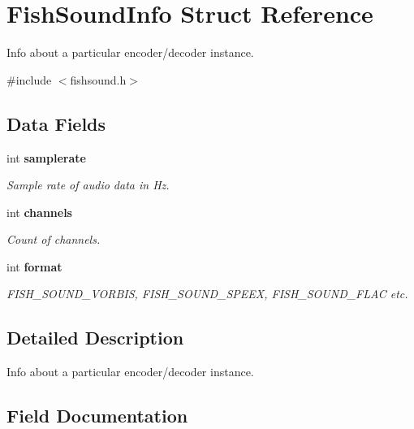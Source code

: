 \section{\-Fish\-Sound\-Info \-Struct \-Reference}
\label{structFishSoundInfo}


\-Info about a particular encoder/decoder instance.  




{\ttfamily \#include $<$fishsound.\-h$>$}

\subsection*{\-Data \-Fields}
\begin{DoxyCompactItemize}
\item 
int {\bf samplerate}\label{structFishSoundInfo_a9b19fb535b78f4df6cd4a275a595e736}

\begin{DoxyCompactList}\small\item\em \-Sample rate of audio data in \-Hz. \end{DoxyCompactList}\item 
int {\bf channels}\label{structFishSoundInfo_ac1e2bc71184e6311f54ff6bcd9160123}

\begin{DoxyCompactList}\small\item\em \-Count of channels. \end{DoxyCompactList}\item 
int {\bf format}
\begin{DoxyCompactList}\small\item\em \-F\-I\-S\-H\-\_\-\-S\-O\-U\-N\-D\-\_\-\-V\-O\-R\-B\-I\-S, \-F\-I\-S\-H\-\_\-\-S\-O\-U\-N\-D\-\_\-\-S\-P\-E\-E\-X, \-F\-I\-S\-H\-\_\-\-S\-O\-U\-N\-D\-\_\-\-F\-L\-A\-C etc. \end{DoxyCompactList}\end{DoxyCompactItemize}


\subsection{\-Detailed \-Description}
\-Info about a particular encoder/decoder instance. 

\subsection{\-Field \-Documentation}
